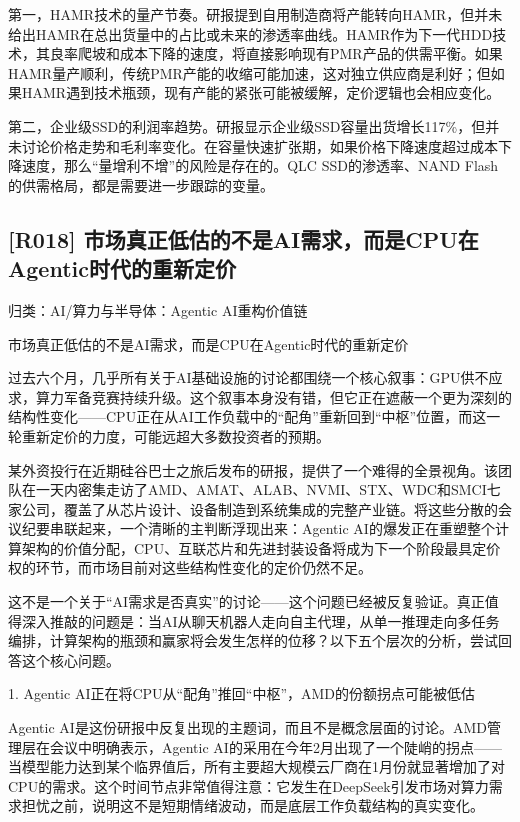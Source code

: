 \documentclass[11pt]{ctexart}
\begin{document}
第一，HAMR技术的量产节奏。研报提到自用制造商将产能转向HAMR，但并未给出HAMR在总出货量中的占比或未来的渗透率曲线。HAMR作为下一代HDD技术，其良率爬坡和成本下降的速度，将直接影响现有PMR产品的供需平衡。如果HAMR量产顺利，传统PMR产能的收缩可能加速，这对独立供应商是利好；但如果HAMR遇到技术瓶颈，现有产能的紧张可能被缓解，定价逻辑也会相应变化。

第二，企业级SSD的利润率趋势。研报显示企业级SSD容量出货增长117\%，但并未讨论价格走势和毛利率变化。在容量快速扩张期，如果价格下降速度超过成本下降速度，那么“量增利不增”的风险是存在的。QLC SSD的渗透率、NAND Flash的供需格局，都是需要进一步跟踪的变量。

\subsection{[R018] 市场真正低估的不是AI需求，而是CPU在Agentic时代的重新定价}
{\small\color{refgray}归类：AI/算力与半导体：Agentic AI重构价值链}

市场真正低估的不是AI需求，而是CPU在Agentic时代的重新定价

过去六个月，几乎所有关于AI基础设施的讨论都围绕一个核心叙事：GPU供不应求，算力军备竞赛持续升级。这个叙事本身没有错，但它正在遮蔽一个更为深刻的结构性变化——CPU正在从AI工作负载中的“配角”重新回到“中枢”位置，而这一轮重新定价的力度，可能远超大多数投资者的预期。

某外资投行在近期硅谷巴士之旅后发布的研报，提供了一个难得的全景视角。该团队在一天内密集走访了AMD、AMAT、ALAB、NVMI、STX、WDC和SMCI七家公司，覆盖了从芯片设计、设备制造到系统集成的完整产业链。将这些分散的会议纪要串联起来，一个清晰的主判断浮现出来：Agentic AI的爆发正在重塑整个计算架构的价值分配，CPU、互联芯片和先进封装设备将成为下一个阶段最具定价权的环节，而市场目前对这些结构性变化的定价仍然不足。

这不是一个关于“AI需求是否真实”的讨论——这个问题已经被反复验证。真正值得深入推敲的问题是：当AI从聊天机器人走向自主代理，从单一推理走向多任务编排，计算架构的瓶颈和赢家将会发生怎样的位移？以下五个层次的分析，尝试回答这个核心问题。

1. Agentic AI正在将CPU从“配角”推回“中枢”，AMD的份额拐点可能被低估

Agentic AI是这份研报中反复出现的主题词，而且不是概念层面的讨论。AMD管理层在会议中明确表示，Agentic AI的采用在今年2月出现了一个陡峭的拐点——当模型能力达到某个临界值后，所有主要超大规模云厂商在1月份就显著增加了对CPU的需求。这个时间节点非常值得注意：它发生在DeepSeek引发市场对算力需求担忧之前，说明这不是短期情绪波动，而是底层工作负载结构的真实变化。
\end{document}
